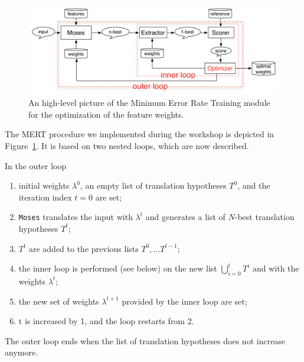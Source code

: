 \documentclass[11pt]{report}
\theoremstyle{plain}
\begin{document}
{\begin{figure}
\begin{center}
 \includegraphics[width=\columnwidth]{MER-ext}
\caption{An high-level picture of the Minimum Error Rate Training module for the optimization of the feature weights.}
\label{fig:MERT}
\end{center}
 \end{figure}
 
The MERT procedure we implemented during the workshop is depicted in Figure~\ref{fig:MERT}. 
It is based on two nested loops, which are now described.

In the outer loop 
\begin{enumerate}
\item initial weights $\lambda^0$, an empty list of translation hypotheses $T^0$, and the iteration index $t=0$ are set;
\item {\tt Moses} translates the input with  $\lambda^t$ and generates a list of $N$-best translation hypotheses $T^t$;
\item $T^t$ are added to the previous lists $T^0, \ldots T^{t-1}$;
\item the inner loop is performed (see below) on the new list $\bigcup_{i=0}^{t}T^i$ and with the weights $\lambda^t$;
\item the  new set of weights $\lambda^{t+1}$ provided by the inner loop are set;
\item t is increased by 1, and the loop restarts from 2.
\end{enumerate}
The outer loop ends when the list of translation hypotheses does not increase anymore.

}
\end{document}
